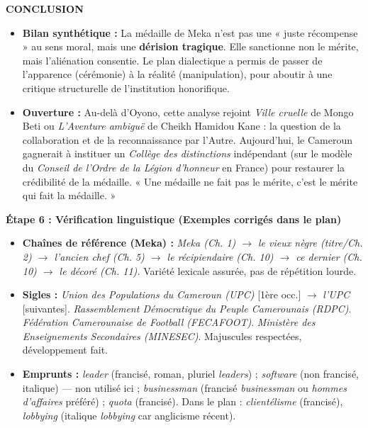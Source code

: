\documentclass[11pt]{article}
\begin{document}
\begin{exoresolu}
\medskip
\noindent \textbf{CONCLUSION}
\begin{itemize}
    \item \textbf{Bilan synthétique :} La médaille de Meka n'est pas une « juste récompense » au sens moral, mais une \textbf{dérision tragique}. Elle sanctionne non le mérite, mais l'aliénation consentie. Le plan dialectique a permis de passer de l'apparence (cérémonie) à la réalité (manipulation), pour aboutir à une critique structurelle de l'institution honorifique.
    \item \textbf{Ouverture :} Au-delà d'Oyono, cette analyse rejoint \emph{Ville cruelle} de Mongo Beti ou \emph{L'Aventure ambiguë} de Cheikh Hamidou Kane : la question de la collaboration et de la reconnaissance par l'Autre. Aujourd'hui, le Cameroun gagnerait à instituer un \emph{Collège des distinctions} indépendant (sur le modèle du \emph{Conseil de l'Ordre de la Légion d'honneur} en France) pour restaurer la crédibilité de la médaille. « Une médaille ne fait pas le mérite, c'est le mérite qui fait la médaille. »
\end{itemize}

\textbf{Étape 6 : Vérification linguistique (Exemples corrigés dans le plan)}
\begin{itemize}
    \item \textbf{Chaînes de référence (Meka) :} \emph{Meka (Ch. 1) $\to$ le vieux nègre (titre/Ch. 2) $\to$ l'ancien chef (Ch. 5) $\to$ le récipiendaire (Ch. 10) $\to$ ce dernier (Ch. 10) $\to$ le décoré (Ch. 11).} Variété lexicale assurée, pas de répétition lourde.
    \item \textbf{Sigles :} \emph{Union des Populations du Cameroun (UPC)} [1ère occ.] $\to$ \emph{l'UPC} [suivantes]. \emph{Rassemblement Démocratique du Peuple Camerounais (RDPC)}. \emph{Fédération Camerounaise de Football (FECAFOOT)}. \emph{Ministère des Enseignements Secondaires (MINESEC)}. Majuscules respectées, développement fait.
    \item \textbf{Emprunts :} \emph{leader} (francisé, roman, pluriel \emph{leaders}) ; \emph{software} (non francisé, italique) — non utilisé ici ; \emph{businessman} (francisé \emph{businessman} ou \emph{hommes d'affaires} préféré) ; \emph{quota} (francisé). Dans le plan : \emph{clientélisme} (francisé), \emph{lobbying} (italique \emph{lobbying} car anglicisme récent).
\end{itemize}
\end{exoresolu}
\end{document}
